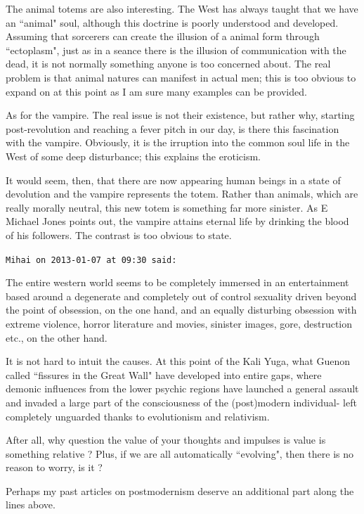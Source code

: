 \begin{footnotesize}
\begin{sffamily}
The animal totems are also interesting. The West has always taught that we have an ``animal" soul, although this doctrine is poorly understood and developed. Assuming that sorcerers can create the illusion of a animal form through ``ectoplasm", just as in a seance there is the illusion of communication with the dead, it is not normally something anyone is too concerned about. The real problem is that animal natures can manifest in actual men; this is too obvious to expand on at this point as I am sure many examples can be provided.

As for the vampire. The real issue is not their existence, but rather why, starting post-revolution and reaching a fever pitch in our day, is there this fascination with the vampire. Obviously, it is the irruption into the common soul life in the West of some deep disturbance; this explains the eroticism.

It would seem, then, that there are now appearing human beings in a state of devolution and the vampire represents the totem. Rather than animals, which are really morally neutral, this new totem is something far more sinister. As E Michael Jones points out, the vampire attains eternal life by drinking the blood of his followers. The contrast is too obvious to state.


\hfill

\texttt{Mihai on 2013-01-07 at 09:30 said: }

The entire western world seems to be completely immersed in an entertainment based around a degenerate and completely out of control sexuality driven beyond the point of obsession, on the one hand, and an equally disturbing obsession with extreme violence, horror literature and movies, sinister images, gore, destruction etc., on the other hand.

It is not hard to intuit the causes. At this point of the Kali Yuga, what Guenon called ``fissures in the Great Wall" have developed into entire gaps, where demonic influences from the lower psychic regions have launched a general assault and invaded a large part of the consciousness of the (post)modern individual- left completely unguarded thanks to evolutionism and relativism. 

After all, why question the value of your thoughts and impulses is value is something relative ? Plus, if we are all automatically ``evolving", then there is no reason to worry, is it ?

Perhaps my past articles on postmodernism deserve an additional part along the lines above.



\end{sffamily}
\end{footnotesize}
